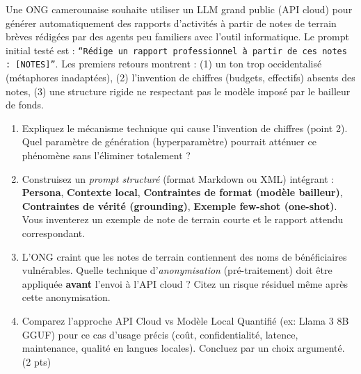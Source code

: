\documentclass[11pt]{article}
\begin{document}
\begin{exercice}
Une ONG camerounaise souhaite utiliser un LLM grand public (API cloud) pour générer automatiquement des rapports d'activités à partir de notes de terrain brèves rédigées par des agents peu familiers avec l'outil informatique. Le prompt initial testé est : \texttt{``Rédige un rapport professionnel à partir de ces notes : [NOTES]''}.
Les premiers retours montrent : (1) un ton trop occidentalisé (métaphores inadaptées), (2) l'invention de chiffres (budgets, effectifs) absents des notes, (3) une structure rigide ne respectant pas le modèle imposé par le bailleur de fonds.
\begin{enumerate}
    \item Expliquez le mécanisme technique qui cause l'invention de chiffres (point 2). Quel paramètre de génération (hyperparamètre) pourrait atténuer ce phénomène sans l'éliminer totalement ?
    \item Construisez un \textit{prompt structuré} (format Markdown ou XML) intégrant : \textbf{Persona}, \textbf{Contexte local}, \textbf{Contraintes de format (modèle bailleur)}, \textbf{Contraintes de vérité (grounding)}, \textbf{Exemple few-shot (one-shot)}. Vous inventerez un exemple de note de terrain courte et le rapport attendu correspondant.
    \item L'ONG craint que les notes de terrain contiennent des noms de bénéficiaires vulnérables. Quelle technique d'\textit{anonymisation} (pré-traitement) doit être appliquée \textbf{avant} l'envoi à l'API cloud ? Citez un risque résiduel même après cette anonymisation.
    \item Comparez l'approche \og API Cloud \fg{} vs \og Modèle Local Quantifié (ex: Llama 3 8B GGUF) \fg{} pour ce cas d'usage précis (coût, confidentialité, latence, maintenance, qualité en langues locales). Concluez par un choix argumenté. (2 pts)
\end{enumerate}
\end{exercice}
\end{document}
